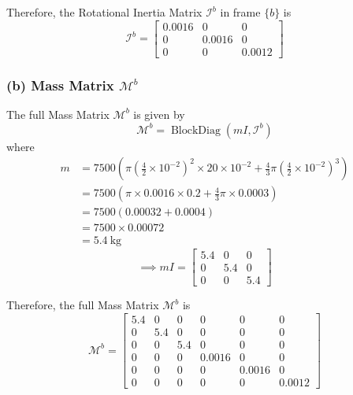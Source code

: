 Therefore, the Rotational Inertia Matrix \( \mathcal{I}^{b} \) in frame \( \{b\} \) is
\begin{equation}
    \mathcal{I}^{b}=\begin{bmatrix}
        0.0016 & 0      & 0      \\
        0      & 0.0016 & 0      \\
        0      & 0      & 0.0012
    \end{bmatrix}
\end{equation}

\subsubsection*{(b) Mass Matrix \( \mathcal{M}^{b} \)}

The full Mass Matrix \( \mathcal{M}^{b} \) is given by
\begin{equation}
    \mathcal{M}^{b}=\operatorname{BlockDiag}\left(m I, \mathcal{I}^{b}\right)
\end{equation}
where
\begin{align*}
    m & =7500\left(\pi\left(\frac{4}{2} \times 10^{-2}\right)^{2} \times 20 \times 10^{-2}+\frac{4}{3} \pi\left(\frac{4}{2} \times 10^{-2}\right)^{3}\right) \\
      & =7500\left(\pi \times 0.0016 \times 0.2+\frac{4}{3} \pi \times 0.0003\right)                                                                         \\
      & =7500\left(0.00032+0.0004\right)                                                                                                                     \\
      & =7500 \times 0.00072                                                                                                                                 \\
      & =5.4 \mathrm{~kg}
\end{align*}
\begin{equation}
    \implies
    m I=\begin{bmatrix}
        5.4 & 0   & 0   \\
        0   & 5.4 & 0   \\
        0   & 0   & 5.4
    \end{bmatrix}
\end{equation}

Therefore, the full Mass Matrix \( \mathcal{M}^{b} \) is
\begin{equation}
    \mathcal{M}^{b}=\begin{bmatrix}
        5.4 & 0   & 0   & 0      & 0      & 0      \\
        0   & 5.4 & 0   & 0      & 0      & 0      \\
        0   & 0   & 5.4 & 0      & 0      & 0      \\
        0   & 0   & 0   & 0.0016 & 0      & 0      \\
        0   & 0   & 0   & 0      & 0.0016 & 0      \\
        0   & 0   & 0   & 0      & 0      & 0.0012
    \end{bmatrix}
\end{equation}

